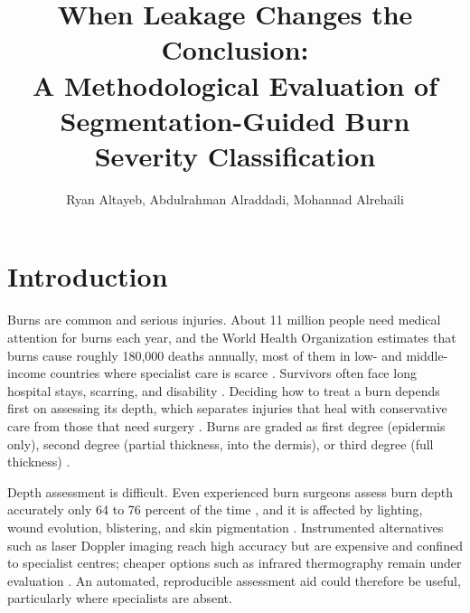 \documentclass{melba}
\title{When Leakage Changes the Conclusion:\\
A Methodological Evaluation of Segmentation-Guided
Burn Severity Classification}
\author{
	\name Ryan Altayeb\aff{1}\orcid{0009-0006-0031-9531},
	\name Abdulrahman Alraddadi\aff{1}\orcid{0009-0000-2325-5063},
	\name Mohannad Alrehaili\aff{1}\orcid{0009-0008-2491-185X}
}
\begin{document}
\twocolumn[\maketitle]

\section{Introduction}
\label{Int}
Burns are common and serious injuries. About 11 million people need medical attention for burns each year, and the World Health Organization estimates that burns cause roughly 180{,}000 deaths annually, most of them in low- and middle-income countries where specialist care is scarce \citep{who,peck}. Survivors often face long hospital stays, scarring, and disability \citep{brusselaers}. Deciding how to treat a burn depends first on assessing its depth, which separates injuries that heal with conservative care from those that need surgery \citep{jackson}. Burns are graded as first degree (epidermis only), second degree (partial thickness, into the dermis), or third degree (full thickness) \citep{heimbach}.

Depth assessment is difficult. Even experienced burn surgeons assess burn depth accurately only 64 to 76 percent of the time \citep{jaskille}, and it is affected by lighting, wound evolution, blistering, and skin pigmentation \citep{monstrey}. Instrumented alternatives such as laser Doppler imaging reach high accuracy but are expensive and confined to specialist centres; cheaper options such as infrared thermography remain under evaluation \citep{dang}. An automated, reproducible assessment aid could therefore be useful, particularly where specialists are absent.
\end{document}
